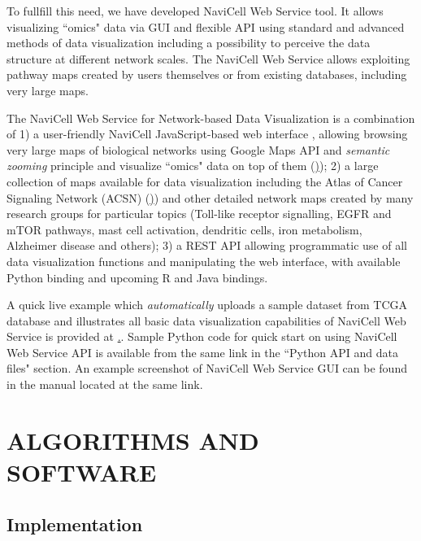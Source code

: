 \documentclass[a4,center,fleqn]{NAR}
\begin{document}
To fullfill this need, we have developed NaviCell Web Service tool. It allows
visualizing ``omics" data via GUI and flexible API using standard and advanced
methods of data visualization including a possibility to perceive the data
structure at different network scales. The NaviCell Web Service allows
exploiting pathway maps created by users themselves or from existing databases,
including very large maps.


\enlargethispage{-65.1pt}

The NaviCell Web Service for Network-based Data
Visualization is a combination of 1) a user-friendly NaviCell JavaScript-based
web interface \cite{kuperstein2013navicell}, allowing browsing very large maps
of biological networks using Google Maps API and \emph{semantic zooming}
principle and visualize ``omics" data on top of them
(\href{https://navicell.curie.fr})); 2) a large collection of maps available for
data visualization including the Atlas of Cancer Signaling Network (ACSN)
(\href{https://acsn.curie.fr}))  and other detailed network maps created by many
research groups for particular topics (Toll-like receptor signalling, EGFR
and mTOR pathways, mast cell activation, dendritic cells, iron metabolism,
Alzheimer disease and others); 3) a REST API allowing programmatic use of all
data visualization functions and manipulating the web interface, with available
Python binding and upcoming R and Java bindings.

A quick live example which \emph{automatically} uploads a sample dataset from
TCGA database and illustrates all basic data visualization capabilities of
NaviCell Web Service is provided at
\href{http://navicell.curie.fr/pages/nav\_web\_service.html}.. Sample Python
code for quick start on using NaviCell Web Service API is available from the
same link in the ``Python API and data files" section. An example screenshot of NaviCell
Web Service GUI can be found in the manual located at the same link.

\section{ALGORITHMS AND SOFTWARE}

\subsection{Implementation}
\end{document}
